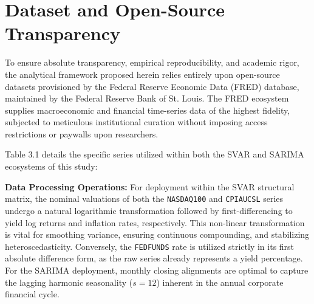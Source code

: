 \documentclass[12pt,a4paper]{report}
\begin{document}
\section{Dataset and Open-Source Transparency}
To ensure absolute transparency, empirical reproducibility, and academic rigor, the analytical framework proposed herein relies entirely upon open-source datasets provisioned by the Federal Reserve Economic Data (FRED) database, maintained by the Federal Reserve Bank of St. Louis. The FRED ecosystem supplies macroeconomic and financial time-series data of the highest fidelity, subjected to meticulous institutional curation without imposing access restrictions or paywalls upon researchers.

Table 3.1 details the specific series utilized within both the SVAR and SARIMA ecosystems of this study:

\begin{table}[H]
\centering
\caption{FRED Datasets for Macroeconomic and Equity Variable Definition.}
\renewcommand{\arraystretch}{1.2} %
\end{table}

\textbf{Data Processing Operations:} For deployment within the SVAR structural matrix, the nominal valuations of both the \texttt{NASDAQ100} and \texttt{CPIAUCSL} series undergo a natural logarithmic transformation followed by first-differencing to yield log returns and inflation rates, respectively. This non-linear transformation is vital for smoothing variance, ensuring continuous compounding, and stabilizing heteroscedasticity. Conversely, the \texttt{FEDFUNDS} rate is utilized strictly in its first absolute difference form, as the raw series already represents a yield percentage. For the SARIMA deployment, monthly closing alignments are optimal to capture the lagging harmonic seasonality ($s=12$) inherent in the annual corporate financial cycle.
\end{document}
